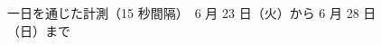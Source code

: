 \documentclass[a4j]{jarticle}
\begin{document}
\begin{figure}[tb]
\begin{center}
{}\\
~
\caption{一日を通じた計測（15 秒間隔）　6 月 23 日（火）から 6 月 28 日（日）まで}
\label{data3-1}
\end{center}
\end{figure}
\end{document}
